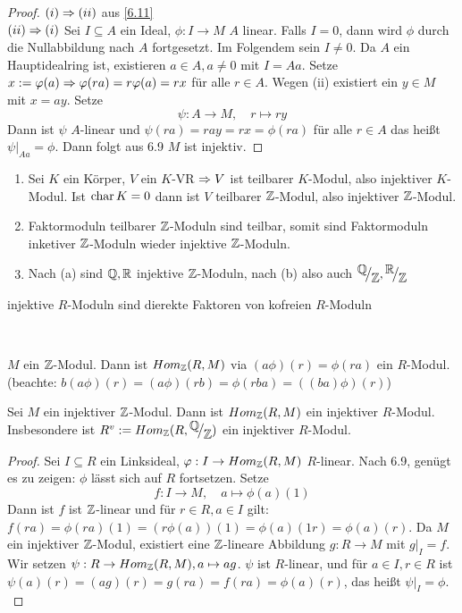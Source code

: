 \begin{proof}
	$(i) \Rightarrow (ii) $ aus \ref{6.11} \\
	$(ii) \Rightarrow (i) $ Sei $ I \subseteq A $ ein Ideal, $\phi: I \to M $ $A$ linear. Falls $ I = 0 $, dann wird $\phi $ durch die Nullabbildung nach $A$ fortgesetzt. Im Folgendem sein $ I \neq 0 $. Da $A$ ein Hauptidealring ist, existieren $ a\in A, a\neq 0 $ mit $I =Aa$. Setze $ x:= \varphi(a) \Rightarrow \varphi(ra)=r\varphi(a) = rx $ für alle $ r \in A$. Wegen (ii) existiert ein $y \in M $ mit $ x = ay $. Setze $$\psi: A \to M,\quad  r \mapsto ry$$
	Dann ist $\psi$ $A$-linear und $ \psi(ra)=  ray = rx = \phi(ra) $ für alle $r \in A $ das heißt $\psi|_{Aa} = \phi.$ Dann folgt aus 6.9 $M$ ist injektiv. 
\end{proof}
\begin{bsp}
	\begin{enumerate} [label= \alph*)]
		\item Sei $K$ ein Körper, $V$ ein $K$-VR $\Rightarrow V$ ist teilbarer $K$-Modul, also injektiver $K$-Modul. Ist $\operatorname{char} K = 0 $ dann ist $V$ teilbarer $\mathbb{Z}$-Modul, also injektiver $\mathbb{Z}$-Modul. 
		\item Faktormoduln teilbarer $\mathbb{Z}$-Moduln sind teilbar, somit sind Faktormoduln inketiver $\mathbb{Z}$-Moduln wieder injektive $\mathbb{Z}$-Moduln. 
		\item Nach (a) sind $\mathbb{Q}, \mathbb{R} $ injektive $\mathbb{Z}$-Moduln, nach (b) also auch $\QR{\Q}{\Z}, \QR{\R}{\Z}$
	\end{enumerate}
\end{bsp}
\begin{Ziel}
	injektive $R$-Moduln sind dierekte Faktoren von kofreien $R$-Moduln 
\end{Ziel} \\
\begin{anm}
	$M$ ein $\mathbb{Z}$-Modul. Dann ist $Hom_{\mathbb{Z}}(R,M)$ via $(a\phi)(r) = \phi(ra) $ ein $R$-Modul. (beachte: $b(a\phi)(r) = (a\phi)(rb) = \phi(rba) = ((ba)\phi)(r) $)
\end{anm}
\begin{bem}\label{6.14}
	Sei $M$ ein injektiver $\mathbb{Z}$-Modul. Dann ist $Hom_{\mathbb{Z}}(R,M)$ ein injektiver $R$-Modul. Insbesondere ist $R^{v} := Hom_{\Z}(R, \QR{\Q}{\Z}) $ ein injektiver $R$-Modul.
\end{bem}
\begin{proof}
	Sei $ I \subseteq R $ ein Linksideal, $\varphi: I \to Hom_{\mathbb{Z}}(R,M) $ $R$-linear. Nach 6.9, genügt es zu zeigen: $\phi$ lässt sich auf $R$ fortsetzen. Setze $$f: I \to M ,\quad a \mapsto \phi(a)(1)$$ Dann ist $f $ ist $\mathbb{Z}$-linear und für $r \in R , a \in I $ gilt: $ f(ra) = \phi(ra)(1)= (r\phi(a))(1) = \phi(a)(1 r) = \phi(a)(r)$. Da $M$ ein injektiver $\mathbb{Z}$-Modul, existiert eine $\mathbb{Z}$-lineare Abbildung $g: R \to M $ mit $g\big|_I=f $. Wir setzen $\psi: R \to Hom_{\mathbb{Z}}(R,M), a \mapsto ag $. $\psi$ ist $R$-linear, und für $a\in I, r \in R $ ist $\psi(a)(r) =(ag)(r) = g(ra) = f(ra) = \phi(a)(r)$, das heißt $\psi\big|_{I}=\phi.$
\end{proof}
